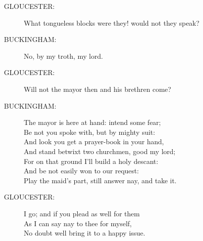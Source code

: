 \documentclass{article}
\begin{document}
\begin{description}
\item[GLOUCESTER:] 
\hspace{1pt}What tongueless blocks were they! would not they speak?\\
\end{description}
\begin{description}
\item[BUCKINGHAM:] 
\hspace{1pt}No, by my troth, my lord.\\
\end{description}
\begin{description}
\item[GLOUCESTER:] 
\hspace{1pt}Will not the mayor then and his brethren come?\\
\end{description}
\begin{description}
\item[BUCKINGHAM:] 
\hspace{1pt}The mayor is here at hand: intend some fear;\\
\hspace{1pt}Be not you spoke with, but by mighty suit:\\
\hspace{1pt}And look you get a prayer-book in your hand,\\
\hspace{1pt}And stand betwixt two churchmen, good my lord;\\
\hspace{1pt}For on that ground I'll build a holy descant:\\
\hspace{1pt}And be not easily won to our request:\\
\hspace{1pt}Play the maid's part, still answer nay, and take it.\\
\end{description}
\begin{description}
\item[GLOUCESTER:] 
\hspace{1pt}I go; and if you plead as well for them\\
\hspace{1pt}As I can say nay to thee for myself,\\
\hspace{1pt}No doubt well bring it to a happy issue.\\
\end{description}
\end{document}
